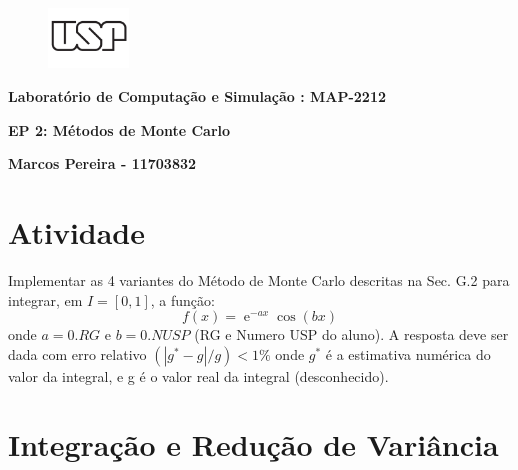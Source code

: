 \documentclass{article}
\DeclareMathOperator{\e}{\mathrm{e}}
\begin{document}
	
\begin{figure}[h!]
    \includegraphics[width=0.19\textwidth]{logo}
\end{figure}


\begin{center}
	{\large \textbf{Laboratório de Computação e Simulação : MAP-2212}}
	
	{\Large\textbf{EP 2: Métodos de Monte Carlo}}
	
	{\large\textbf{Marcos Pereira -  11703832}}

\end{center}

\section*{Atividade}

Implementar as 4 variantes do Método de Monte Carlo descritas na Sec. G.2 para integrar, em $I=\left[0, 1\right]$, a função:
$$f(x)=\e^{-ax}\cos(bx)$$ onde $a= 0.RG$   e $b=0.NUSP$  (RG e Numero USP do aluno).
A resposta deve ser dada com erro relativo $(  | g^* - g | / g  )  <  1\%$ onde $g^*$ é a estimativa numérica do valor da integral, e g é o valor real da integral (desconhecido). 


\section{Integração e Redução de Variância}
\end{document}
